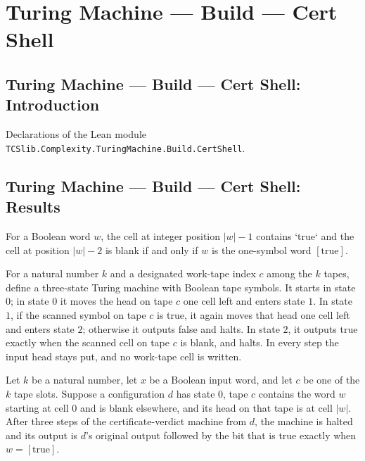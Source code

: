 \section{Turing Machine --- Build --- Cert Shell}
\subsection*{Turing Machine --- Build --- Cert Shell: Introduction}

Declarations of the Lean module \texttt{TCSlib.Complexity.TuringMachine.Build.CertShell}.

\subsection*{Turing Machine --- Build --- Cert Shell: Results}

\begin{theorem}
\label{Turing.cert_tail_test}
\leanok
{}
For a Boolean word $w$, the cell at integer position $|w|-1$ contains `true` and the
cell at position $|w|-2$ is blank if and only if $w$ is the one-symbol word
$[\text{true}]$.
\end{theorem}

\begin{definition}
\label{Turing.certVerdictTM}
\leanok
{}
For a natural number $k$ and a designated work-tape index $c$ among the $k$ tapes,
define a three-state Turing machine with Boolean tape symbols. It starts in state $0$;
in state $0$ it moves the head on tape $c$ one cell left and enters state $1$. In state
$1$, if the scanned symbol on tape $c$ is true, it again moves that head one cell left
and enters state $2$; otherwise it outputs false and halts. In state $2$, it outputs
true exactly when the scanned cell on tape $c$ is blank, and halts. In every step the
input head stays put, and no work-tape cell is written.
\end{definition}

\begin{theorem}
\label{Turing.certVerdict_run}
\leanok
{}
Let $k$ be a natural number, let $x$ be a Boolean input word, and let $c$ be one of the
$k$ tape slots. Suppose a configuration $d$ has state $0$, tape $c$ contains the word
$w$ starting at cell $0$ and is blank elsewhere, and its head on that tape is at cell
$|w|$. After three steps of the certificate-verdict machine from $d$, the machine is
halted and its output is $d$'s original output followed by the bit that is true exactly
when $w=[\mathrm{true}]$.
\end{theorem}


